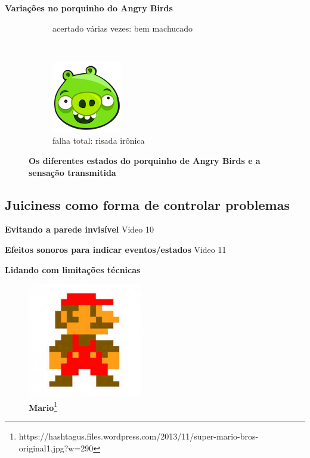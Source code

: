 \expandafter\documentclass\expandafter[table, usenames, svgnames, dvipsnames, \classopts]{beamer}
\begin{document}
\begin{frame}{\textbf{Variações no porquinho do Angry Birds}}
\begin{figure}
\begin{subfigure}[!h]{0.2\paperwidth}
	        \caption{\scriptsize acertado várias vezes: bem machucado}
	    \end{subfigure}
	    ~
		\begin{subfigure}[!h]{0.2\paperwidth}
			\centering
	        \includegraphics[height=0.2\paperheight]{angry-birds-pig5}
	        \caption{\scriptsize falha total: risada irônica}
	    \end{subfigure}

	    \caption{\textbf{Os diferentes estados do porquinho de Angry Birds e a sensação transmitida}}
    \end{figure}

\end{frame}

\subsection{Juiciness como forma de controlar problemas}

\begin{frame}{\textbf{Evitando a parede invisível}}
    \centering
    Video 10
\end{frame}

\begin{frame}{\textbf{Efeitos sonoros para indicar eventos/estados}}
    \centering
    Video 11
\end{frame}

\begin{frame}{\textbf{Lidando com limitações técnicas}}
    \centering
    \begin{figure}
        \includegraphics[height=5cm]{mario_original}
        \caption{\scriptsize\textbf{Mario}\footnote{https://hashtagus.files.wordpress.com/2013/11/super-mario-bros-original1.jpg?w=290}}
    \end{figure}
\end{frame}
\end{document}
